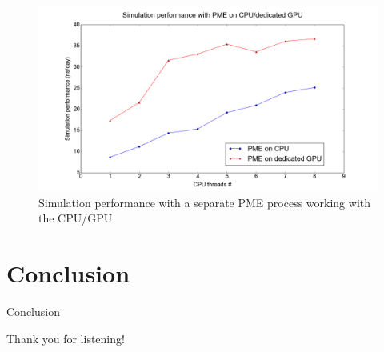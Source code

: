 \documentclass[11pt]{beamer}
\begin{document}
\FloatBarrier
\begin{figure} [h!]
    \centering
    \includegraphics[width=1\textwidth]{pics/CPU_GPU_ADH.png}
    \caption{Simulation performance with a separate PME process working with the CPU/GPU}
    \label{fig:sepGPUNEW}
\end{figure}
\FloatBarrier

\section{Conclusion}
\begin{frame}{Conclusion}
\end{frame}

\begin{frame}[plain]
      Thank you for listening!
\end{frame}

\end{document}
